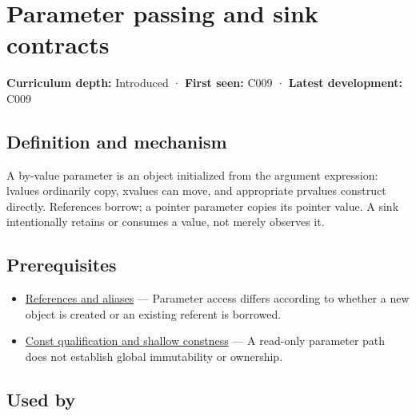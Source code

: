 \hypertarget{appendix-d5908f75721f}{}\label{referencestart:appendix-d5908f75721f}
\section{Parameter passing and sink contracts}\label{appendix-d5908f75721f-parameter-passing-and-sink-contracts}

\hypertarget{appendix-d5908f75721f-parameter-passing-and-sink-contracts}{}

\textbf{Curriculum depth:} Introduced · \textbf{First seen:} C009 · \textbf{Latest development:} C009

\begin{allmightroledefinition}

\subsection{Definition and mechanism}\label{appendix-d5908f75721f-definition-and-mechanism}

\hypertarget{appendix-d5908f75721f-definition-and-mechanism}{}

A by-value parameter is an object initialized from the argument expression: lvalues ordinarily copy, xvalues can move, and appropriate prvalues construct directly. References borrow; a pointer parameter copies its pointer value. A sink intentionally retains or consumes a value, not merely observes it.

\end{allmightroledefinition}

\subsection{Prerequisites}\label{appendix-d5908f75721f-prerequisites}

\hypertarget{appendix-d5908f75721f-prerequisites}{}

\begin{itemize}
\tightlist
\item
  \hyperref[appendix-d6d562ca9fbb]{References and aliases} --- Parameter access differs according to whether a new object is created or an existing referent is borrowed.
\item
  \hyperref[appendix-c25d60fed375]{Const qualification and shallow constness} --- A read-only parameter path does not establish global immutability or ownership.
\end{itemize}

\subsection{Used by}\label{appendix-d5908f75721f-used-by}

